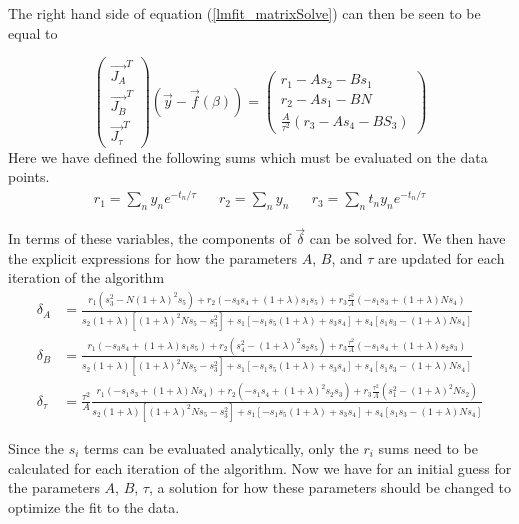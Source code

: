 The right hand side of equation (\ref{lmfit_matrixSolve}) can then be seen to be equal to

\begin{equation}
	\begin{pmatrix}
		\vec{J_A}^T \\ 
		\vec{J_B}^T \\ 
		\vec{J_\tau}^T
	\end{pmatrix}
	\left(\vec{y} - \vec{f}(\beta) \right) 
	=
	\begin{pmatrix}
		r_1 - A s_2 - B s_1 \\ 
		r_2 - A s_1 - B N \\ 
		\frac{A}{\tau^2}\left( r_3 -A s_4 - B S_3 \right)
	\end{pmatrix} 
\end{equation}
Here we have defined the following sums which must be evaluated on the data points.
\begin{align}
	r_1 = \sum_n y_n e^{-t_n/\tau} &&
	r_2 = \sum_n y_n &&
	r_3 = \sum_n t_n y_n e^{-t_n/\tau}
\end{align}

In terms of these variables, the components of $\vec{\delta}$ can be solved for. We then have the explicit expressions for how the parameters $A$, $B$, and $\tau$ are updated for each iteration of the algorithm	
\begin{align}
	\delta_A &=\frac{r_1(s_3^2 -N(1+\lambda)^2 s_5) + r_2 (-s_3 s_4 + (1+\lambda) s_1 s_5) + r_3 \frac{\tau^2}{A}(-s_1 s_3 + (1+\lambda)N s_4)}{s_2(1+\lambda)\left[(1+\lambda)^2 N s_5 - s_3^2 \right] + s_1 \left[-s_1 s_5 (1+\lambda) + s_3 s_4 \right] + s_4\left[ s_1 s_3 - (1 + \lambda)N s_4\right]} \\
	\delta_B &= \frac{r_1(-s_3s_4 +(1+\lambda)s_1s_5) + r_2 (s_4^2 - (1+\lambda)^2 s_2 s_5) + r_3 \frac{\tau^2}{A}(-s_1 s_4 + (1+\lambda)s_2 s_3)}{s_2(1+\lambda)\left[(1+\lambda)^2 N s_5 - s_3^2 \right] + s_1 \left[-s_1 s_5 (1+\lambda) + s_3 s_4 \right] + s_4\left[ s_1 s_3 - (1 + \lambda)N s_4\right]} \\
	\delta_\tau &=\frac{\tau^2}{A} \frac{r_1(-s_1s_3 +(1+\lambda)Ns_4) + r_2 (-s_1s_4 + (1+\lambda)^2 s_2 s_3) + r_3 \frac{\tau^2}{A}(s_1^2 - (1+\lambda)^2N s_2)}{s_2(1+\lambda)\left[(1+\lambda)^2 N s_5 - s_3^2 \right] + s_1 \left[-s_1 s_5 (1+\lambda) + s_3 s_4 \right] + s_4\left[ s_1 s_3 - (1 + \lambda)N s_4\right]}
\end{align}

Since the $s_i$ terms can be evaluated analytically, only the $r_i$ sums need to be calculated for each iteration of the algorithm. Now we have for an initial guess for the parameters $A$, $B$, $\tau$, a solution for how these parameters should be changed to optimize the fit to the data.

